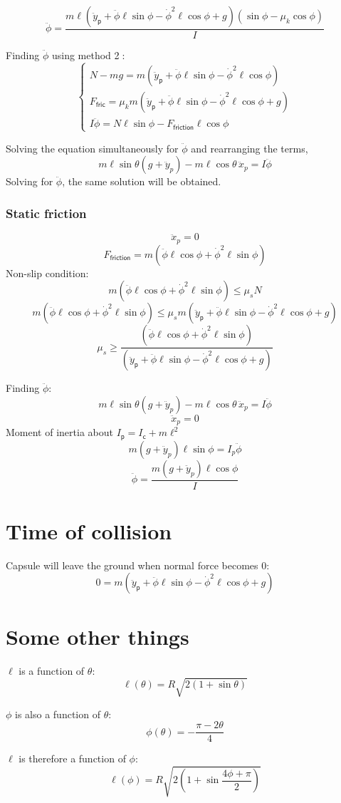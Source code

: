 \documentclass{scrartcl}
\begin{document}
$$\boxed{\ddot \phi=\frac{m\ell(\ddot{y}_{\textsf{p}}+\ddot \phi \ell \sin\phi-\dot \phi^2 \ell \cos\phi+g)(\sin\phi-\mu_k\cos\phi)}{I}}$$

\vspace{\baselineskip}
Finding $\ddot \phi$ using method \textcircled{2}:
$$
    \begin{cases}
      N-mg=m(\ddot{y}_{\textsf{p}}+\ddot \phi \ell \sin\phi-\dot \phi^2 \ell \cos\phi)\\
      F_{\textsf{fric}}=
\mu_km(\ddot{y}_{\textsf{p}}+\ddot \phi \ell \sin\phi-\dot \phi^2 \ell \cos\phi+g)\\
      I\ddot \phi=N\ell\sin\phi-F_{\textsf{friction}}\ell\cos\phi
    \end{cases}    
$$

Solving the equation simultaneously for $\ddot\phi$ and rearranging the terms,
$$\boxed{m\ell \sin \theta (g+ \ddot y_p)-m\ell \cos\theta \, \ddot x_p=I\ddot \phi}$$
Solving for $\ddot \phi$, the same solution will be obtained.

\subsubsection{Static friction}
$$\ddot x_p=0$$
$$F_{\textsf{friction}}=m(\boxed{\ddot \phi} \ell \cos \phi+ \dot \phi^2 \ell \sin\phi)$$
Non-slip condition:
$$m(\ddot \phi \ell \cos \phi+ \dot \phi^2 \ell \sin\phi)\leq \mu_sN$$
$$m(\ddot \phi \ell \cos \phi+ \dot \phi^2 \ell \sin\phi)\leq \mu_sm(\ddot{y}_{\textsf{p}}+\ddot \phi \ell \sin\phi-\dot \phi^2 \ell \cos\phi+g)$$
$$\boxed{\mu_s\geq\frac{(\ddot \phi \ell \cos \phi+ \dot \phi^2 \ell \sin\phi)}{(\ddot{y}_{\textsf{p}}+\ddot \phi \ell \sin\phi-\dot \phi^2 \ell \cos\phi+g)}}$$

\vspace{\baselineskip}
Finding $\ddot \phi$:
$$\boxed{m\ell \sin \theta (g+ \ddot y_p)-m\ell \cos\theta \, \ddot x_p=I\ddot \phi}$$
$$\ddot x_p=0$$
Moment of inertia about $I_{\textsf{p}}=I_{\textsf{c}}+m\ell^2$
$$m(g+\ddot y_p)\ell \sin \phi=I_p\ddot \phi$$
$$\ddot \phi=\frac{m(g+\ddot y_p)\ell\cos\phi}{I}$$

\section{Time of collision}
Capsule will leave the ground when normal force becomes 0:
$$0=m(\ddot{y}_{\textsf{p}}+\ddot \phi \ell \sin\phi-\dot \phi^2 \ell \cos\phi+g)$$

\section{Some other things}
$\ell$ is a function of $\theta$:
$$\ell (\theta) = R  \sqrt{2(1+\sin\theta)}$$
\vspace{\baselineskip}

$\phi$ is also a function of $\theta$:
$$\phi(\theta)=-\frac{\pi-2\theta}{4}$$
\vspace{\baselineskip}

$\ell$ is therefore a function of $\phi$:
$$\ell(\phi) = R  \sqrt{2(1+\sin\frac{4\phi+\pi}{2})}$$
\end{document}
